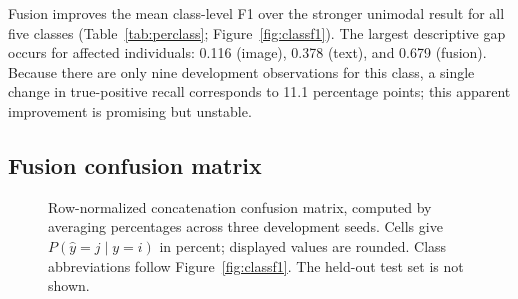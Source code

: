 \documentclass[11pt,a4paper]{article}
\begin{document}
Fusion improves the mean class-level F1 over the stronger unimodal result for all five classes (Table~\ref{tab:perclass}; Figure~\ref{fig:classf1}). The largest descriptive gap occurs for affected individuals: 0.116 (image), 0.378 (text), and 0.679 (fusion). Because there are only nine development observations for this class, a single change in true-positive recall corresponds to 11.1 percentage points; this apparent improvement is promising but unstable.

\subsection{Fusion confusion matrix}
\begin{figure}[htbp]
\centering
{}
\caption{Row-normalized concatenation confusion matrix, computed by averaging percentages across three development seeds. Cells give $P(\widehat{y}=j\mid y=i)$ in percent; displayed values are rounded. Class abbreviations follow Figure~\ref{fig:classf1}. The held-out test set is not shown.}
\label{fig:confusion}
\end{figure}
\end{document}
